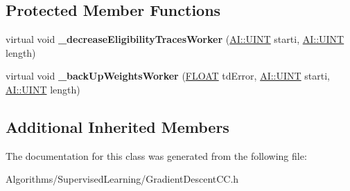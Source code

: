 \subsection*{Protected Member Functions}
\begin{DoxyCompactItemize}
\item 
\hypertarget{classAI_1_1Algorithm_1_1GradientDescentCC_a671233415fd282b198c6d0999e63832a}{virtual void {\bfseries \-\_\-decrease\-Eligibility\-Traces\-Worker} (\hyperlink{namespaceAI_ab6e14dc1e659854858a87e511f1439ec}{A\-I\-::\-U\-I\-N\-T} starti, \hyperlink{namespaceAI_ab6e14dc1e659854858a87e511f1439ec}{A\-I\-::\-U\-I\-N\-T} length)}\label{classAI_1_1Algorithm_1_1GradientDescentCC_a671233415fd282b198c6d0999e63832a}

\item 
\hypertarget{classAI_1_1Algorithm_1_1GradientDescentCC_a647a9d1f60731c366695a7c1fac008d4}{virtual void {\bfseries \-\_\-back\-Up\-Weights\-Worker} (\hyperlink{namespaceAI_a41b74884a20833db653dded3918e05c3}{F\-L\-O\-A\-T} td\-Error, \hyperlink{namespaceAI_ab6e14dc1e659854858a87e511f1439ec}{A\-I\-::\-U\-I\-N\-T} starti, \hyperlink{namespaceAI_ab6e14dc1e659854858a87e511f1439ec}{A\-I\-::\-U\-I\-N\-T} length)}\label{classAI_1_1Algorithm_1_1GradientDescentCC_a647a9d1f60731c366695a7c1fac008d4}

\end{DoxyCompactItemize}
\subsection*{Additional Inherited Members}


The documentation for this class was generated from the following file\-:\begin{DoxyCompactItemize}
\item 
Algorithms/\-Supervised\-Learning/Gradient\-Descent\-C\-C.\-h\end{DoxyCompactItemize}
